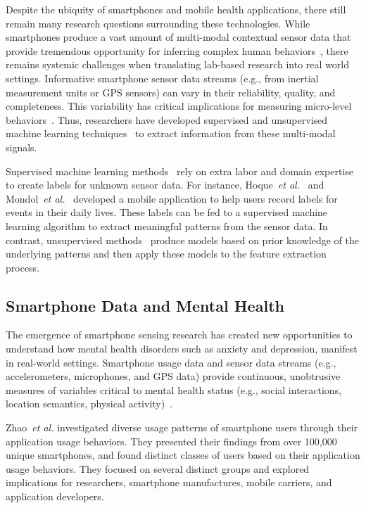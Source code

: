 Despite the ubiquity of smartphones and mobile health applications, there still remain many research questions surrounding these technologies. While smartphones produce a vast amount of multi-modal contextual sensor data that provide tremendous opportunity for inferring complex human behaviors~\cite{spruijt2014dynamic, riley2011health}, there remains systemic challenges when translating lab-based research into real world settings.  Informative smartphone sensor data streams (e.g., from inertial measurement units or GPS sensors) can vary in their reliability, quality, and completeness. This variability has critical implications for measuring micro-level behaviors~\cite{aung2016}. Thus, researchers have developed supervised and unsupervised machine learning techniques~\cite{bulling2014tutorial, mukhopadhyay2015wearable, riley2011health} to extract information from these multi-modal signals.

Supervised machine learning methods~\cite{suryadevara2013forecasting, do2014and, alshurafa2014designing} rely on extra labor and domain expertise to create labels for unknown sensor data. For instance, Hoque~\emph{et al.}~\cite{hoque2014vocal} and Mondol~\emph{et al.}~\cite{mondol2016lifemaps} developed a mobile application to help users record labels for events in their daily lives. These labels can be fed to a supervised machine learning algorithm to extract meaningful patterns from the sensor data. In contrast, unsupervised methods~\cite{harari2017patterns, li2014prediction, min2013mining} produce models based on prior knowledge of the underlying patterns and then apply these models to the feature extraction process. 

\subsection{Smartphone Data and Mental Health}
The emergence of smartphone sensing research has created new opportunities to understand how mental health disorders such as anxiety and depression, manifest in real-world settings.  Smartphone usage data and sensor data streams (e.g., accelerometers, microphones, and GPS data) provide continuous, unobtrusive measures of variables critical to mental health status (e.g., social interactions, location semantics, physical activity)~\cite{zhao2016discovering,wang2014studentlife,huang2016assessing,madan2010social,madan2012sensing}.

Zhao~\emph{et al.}\cite{zhao2016discovering} investigated diverse usage patterns of smartphone users through their application usage behaviors.  They presented their findings from over 100,000 unique smartphones, and found distinct classes of users based on their application usage behaviors.  They focused on several distinct groups and explored implications for researchers, smartphone manufactures, mobile carriers, and application developers. 
% 
% 

